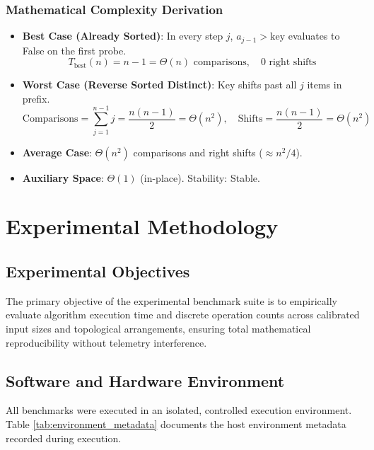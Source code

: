 \documentclass[11pt,a4paper,oneside]{report}
\theoremstyle{definition}
\begin{document}
\subsection{Mathematical Complexity Derivation}
\begin{itemize}
    \item \textbf{Best Case (Already Sorted)}: In every step $j$, $a_{j-1} > \text{key}$ evaluates to False on the first probe.
    $$T_{\text{best}}(n) = n - 1 = \Theta(n) \text{ comparisons}, \quad 0 \text{ right shifts}$$
    \item \textbf{Worst Case (Reverse Sorted Distinct)}: Key shifts past all $j$ items in prefix.
    $$\text{Comparisons} = \sum_{j=1}^{n-1} j = \frac{n(n - 1)}{2} = \Theta(n^2), \quad \text{Shifts} = \frac{n(n - 1)}{2} = \Theta(n^2)$$
    \item \textbf{Average Case}: $\Theta(n^2)$ comparisons and right shifts ($\approx n^2 / 4$).
    \item \textbf{Auxiliary Space}: $\Theta(1)$ (in-place). Stability: Stable.
\end{itemize}

\chapter{Experimental Methodology}
\label{chap:methodology}

\section{Experimental Objectives}
The primary objective of the experimental benchmark suite is to empirically evaluate algorithm execution time and discrete operation counts across calibrated input sizes and topological arrangements, ensuring total mathematical reproducibility without telemetry interference.

\section{Software and Hardware Environment}
All benchmarks were executed in an isolated, controlled execution environment. Table \ref{tab:environment_metadata} documents the host environment metadata recorded during execution.
\end{document}
